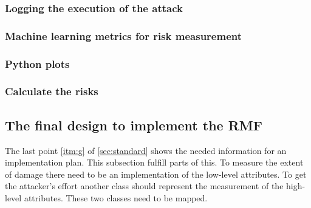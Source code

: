 \subsubsection*{Logging the execution of the attack}


\subsubsection*{Machine learning metrics for risk measurement}


\subsubsection*{Python plots}


\subsubsection*{Calculate the risks}

\subsection{The final design to implement the RMF}

The last point \ref{itm:g} of \ref{sec:standard} shows the needed information for an implementation plan. This subsection fulfill parts of this.
To measure the extent of damage there need to be an implementation of the low-level attributes. To get the attacker's effort another class should represent the measurement of the high-level attributes. These two classes need to be mapped.
